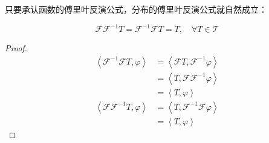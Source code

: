 只要承认函数的傅里叶反演公式，分布的傅里叶反演公式就自然成立：\begin{theorem}[分布的傅里叶反演公式]
    \[\mathcal{F} \mathcal{F} ^{-1}T=\mathcal{F} ^{-1}\mathcal{F} T=T,\quad\forall T\in\mathcal{T}\]
\end{theorem}
\begin{proof}
    \begin{align*}
    \left\langle \mathcal{F} ^{-1}\mathcal{F} T,\varphi\right\rangle & =\left\langle \mathcal{F} T,\mathcal{F} ^{-1}\varphi\right\rangle \\
                                                          & =\left\langle T,\mathcal{F} \mathcal{F} ^{-1}\varphi\right\rangle \\
                                                          & =\left\langle T,\varphi\right\rangle                              \\
    \left\langle \mathcal{F} \mathcal{F} ^{-1}T,\varphi\right\rangle & =\left\langle T,\mathcal{F} ^{-1}\mathcal{F} \varphi\right\rangle \\
                                                          & =\left\langle T,\varphi\right\rangle
\end{align*}
\end{proof}

